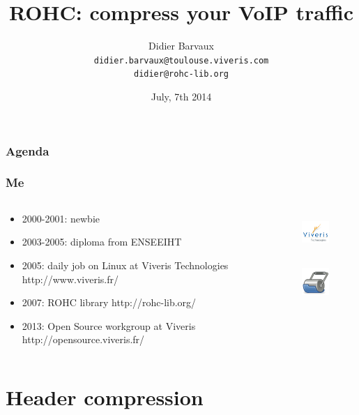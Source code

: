 \documentclass[utf8]{beamer}
\title{ROHC: compress your VoIP traffic}
\author[Viveris Technologies]{Didier Barvaux \\ \texttt{didier.barvaux@toulouse.viveris.com} \\ \texttt{didier@rohc-lib.org}}
\date[Formation]{July, 7th 2014}
\begin{document}
\begin{frame}
		\titlepage
\end{frame}

\begin{frame}
	\frametitle{Agenda}
	\tableofcontents[hideallsubsections]
\end{frame}

\begin{frame}
	\frametitle{Me}
	\begin{block}{}
		\begin{columns}
			\begin{column}[T]{85mm}
				\begin{itemize}
					\item 2000-2001: newbie
					\item 2003-2005: diploma from ENSEEIHT
					\item 2005: daily job on Linux at Viveris Technologies {\tiny http://www.viveris.fr/}
					\item 2007: ROHC library {\tiny http://rohc-lib.org/}
					\item 2013: Open Source workgroup at Viveris {\tiny http://opensource.viveris.fr/}
				\end{itemize}
			\end{column}
			\begin{column}[T]{25mm}
				\begin{figure}
					\includegraphics[height=15mm]{images/viveris_logo.png}
				\end{figure}
				\begin{figure}
					\includegraphics[height=13mm]{images/rohc_logo.png}
				\end{figure}
			\end{column}
		\end{columns}
	\end{block}
\end{frame}




\section{Header compression}
\end{document}
